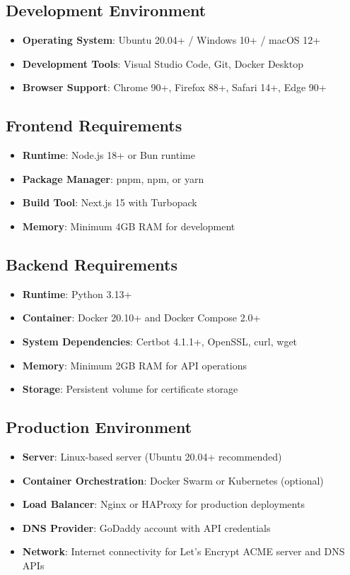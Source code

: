 \subsection{Development Environment}
\begin{itemize}
    \item \textbf{Operating System}: Ubuntu 20.04+ / Windows 10+ / macOS 12+
    \item \textbf{Development Tools}: Visual Studio Code, Git, Docker Desktop
    \item \textbf{Browser Support}: Chrome 90+, Firefox 88+, Safari 14+, Edge 90+
\end{itemize}

\subsection{Frontend Requirements}
\begin{itemize}
    \item \textbf{Runtime}: Node.js 18+ or Bun runtime
    \item \textbf{Package Manager}: pnpm, npm, or yarn
    \item \textbf{Build Tool}: Next.js 15 with Turbopack
    \item \textbf{Memory}: Minimum 4GB RAM for development
\end{itemize}

\subsection{Backend Requirements}
\begin{itemize}
    \item \textbf{Runtime}: Python 3.13+
    \item \textbf{Container}: Docker 20.10+ and Docker Compose 2.0+
    \item \textbf{System Dependencies}: Certbot 4.1.1+, OpenSSL, curl, wget
    \item \textbf{Memory}: Minimum 2GB RAM for API operations
    \item \textbf{Storage}: Persistent volume for certificate storage
\end{itemize}

\subsection{Production Environment}
\begin{itemize}
    \item \textbf{Server}: Linux-based server (Ubuntu 20.04+ recommended)
    \item \textbf{Container Orchestration}: Docker Swarm or Kubernetes (optional)
    \item \textbf{Load Balancer}: Nginx or HAProxy for production deployments
    \item \textbf{DNS Provider}: GoDaddy account with API credentials
    \item \textbf{Network}: Internet connectivity for Let's Encrypt ACME server and DNS APIs
\end{itemize}

